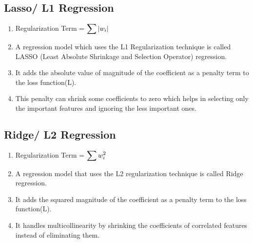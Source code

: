 \subsection{Lasso/ L1 Regression}

\begin{enumerate}
    \item Regularization Term = $ \displaystyle\sum \left| w_i \right|$
    \hfill \cite{geeksforgeeks/machine-learning/regularization-in-machine-learning}

    \item A regression model which uses the L1 Regularization technique is called LASSO (Least Absolute Shrinkage and Selection Operator) regression. 
    \hfill \cite{geeksforgeeks/machine-learning/regularization-in-machine-learning}
    
    \item It adds the absolute value of magnitude of the coefficient as a penalty term to the loss function(L). 
    \hfill \cite{geeksforgeeks/machine-learning/regularization-in-machine-learning}
    
    \item This penalty can shrink some coefficients to zero which helps in selecting only the important features and ignoring the less important ones.
    \hfill \cite{geeksforgeeks/machine-learning/regularization-in-machine-learning}
\end{enumerate}




\subsection{Ridge/ L2 Regression}

\begin{enumerate}
    \item Regularization Term = $ \displaystyle\sum w_i^2$
    \hfill \cite{geeksforgeeks/machine-learning/regularization-in-machine-learning}
    
    \item A regression model that uses the L2 regularization technique is called Ridge regression. 
    \hfill \cite{geeksforgeeks/machine-learning/regularization-in-machine-learning}
    
    \item It adds the squared magnitude of the coefficient as a penalty term to the loss function(L). 
    \hfill \cite{geeksforgeeks/machine-learning/regularization-in-machine-learning}
    
    \item It handles multicollinearity by shrinking the coefficients of correlated features instead of eliminating them.
    \hfill \cite{geeksforgeeks/machine-learning/regularization-in-machine-learning}
\end{enumerate}




